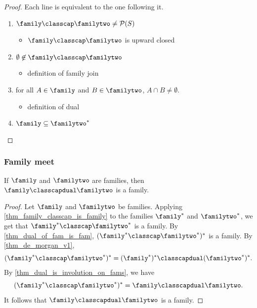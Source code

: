\begin{proof}
     Each line is equivalent to the one following it.
    \begin{enumerate}
        \item $\family \classcap \familytwo \neq \mathcal{P}(S)$
        \begin{itemize}
            \item[--] $\family \classcap \familytwo$ is upward closed
        \end{itemize}
        \item $\emptyset \not\in \family \classcap \familytwo$
        \begin{itemize}
            \item[--] definition of family join
        \end{itemize}
        \item for all $A \in \family$ and $B \in \familytwo$, $A \cap B \neq \emptyset$.
        \begin{itemize}
            \item[--] definition of dual
        \end{itemize}
        \item $\family \subseteq \familytwo^*$
    \end{enumerate}
\end{proof}

\subsubsection{Family meet}

\begin{theorem}
\label{thm_family_classcapdual_is_family}
    If $\family$ and $\familytwo$ are families, then $\family \classcapdual \familytwo$ is a family.
\end{theorem}

\begin{proof}
    Let $\family$ and $\familytwo$ be families.  Applying \cref{thm_family_classcap_is_family} to the families $\family^*$ and $\familytwo^*$, we get that $\family^* \classcap \familytwo^*$ is a family.  By \cref{thm_dual_of_fam_is_fam}, $(\family^* \classcap \familytwo^*)^*$ is a family.  By \cref{thm_de_morgan_v1},
    \[(\family^* \classcap \familytwo^*)^* = (\family^*)^* \classcapdual (\familytwo^*)^*.\]
    By \cref{thm_dual_is_involution_on_fams}, we have
    \[(\family^* \classcap \familytwo^*)^* = \family \classcapdual \familytwo.\]
    It follows that $\family \classcapdual \familytwo$ is a family.
\end{proof}

